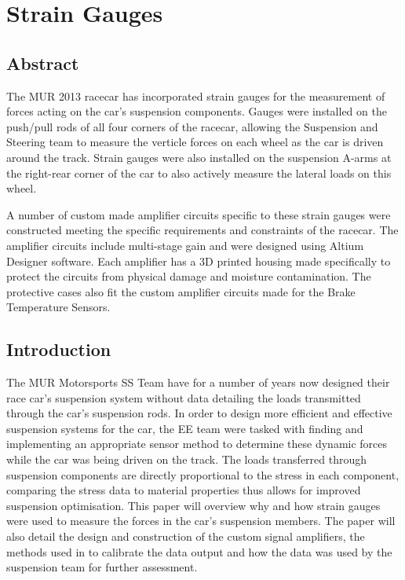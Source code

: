 \chapter{Strain Gauges}

\section{Abstract}
The MUR 2013 racecar has incorporated strain gauges for the measurement of forces acting on the car's suspension components. Gauges were installed on the push/pull rods of all four corners of the racecar, allowing the Suspension and Steering team to measure the verticle forces on each wheel as the car is driven around the track. Strain gauges were also installed on the suspension A-arms at the right-rear corner of the car to also actively measure the lateral loads on this wheel.

A number of custom made amplifier circuits specific to these strain gauges were constructed meeting the specific requirements and constraints of the racecar. The amplifier circuits include multi-stage gain and were designed using Altium Designer software. Each amplifier has a 3D printed housing made specifically to protect the circuits from physical damage and moisture contamination. The protective cases also fit the custom amplifier circuits made for the Brake Temperature Sensors.

\section{Introduction}
The MUR Motorsports SS Team have for a number of years now designed their race car's suspension system without data detailing the loads transmitted through the car's suspension rods. In order to design more efficient and effective suspension systems for the car, the EE team were tasked with finding and implementing an appropriate sensor method to determine these dynamic forces while the car was being driven on the track. The loads transferred through suspension components are directly proportional to the stress in each component, comparing the stress data to material properties thus allows for improved suspension optimisation. This paper will overview why and how strain gauges were used to measure the forces in the car's suspension members. The paper will also detail the design and construction of the custom signal amplifiers, the methods used in to calibrate the data output and how the data was used by the suspension team for further assessment.\\

